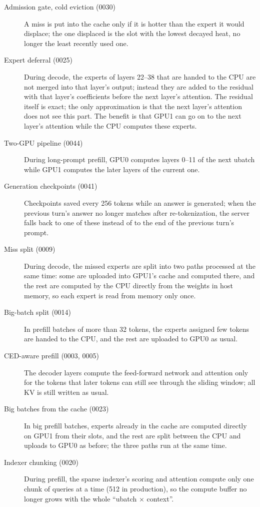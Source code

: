\documentclass[11pt,a4paper]{article}
\begin{document}
\begin{description}
  \item[Admission gate, cold eviction (0030)] A miss is put into the cache only if it is hotter than the expert it would displace; the one displaced is the slot with the lowest decayed heat, no longer the least recently used one.
  \item[Expert deferral (0025)] During decode, the experts of layers 22--38 that are handed to the CPU are not merged into that layer's output; instead they are added to the residual with that layer's coefficients before the next layer's attention. The residual itself is exact; the only approximation is that the next layer's attention does not see this part. The benefit is that GPU1 can go on to the next layer's attention while the CPU computes these experts.
  \item[Two-GPU pipeline (0044)] During long-prompt prefill, GPU0 computes layers 0--11 of the next ubatch while GPU1 computes the later layers of the current one.
  \item[Generation checkpoints (0041)] Checkpoints saved every 256 tokens while an answer is generated; when the previous turn's answer no longer matches after re-tokenization, the server falls back to one of these instead of to the end of the previous turn's prompt.
  \item[Miss split (0009)] During decode, the missed experts are split into two paths processed at the same time: some are uploaded into GPU1's cache and computed there, and the rest are computed by the CPU directly from the weights in host memory, so each expert is read from memory only once.
  \item[Big-batch split (0014)] In prefill batches of more than 32 tokens, the experts assigned few tokens are handed to the CPU, and the rest are uploaded to GPU0 as usual.
  \item[CED-aware prefill (0003, 0005)] The decoder layers compute the feed-forward network and attention only for the tokens that later tokens can still see through the sliding window; all KV is still written as usual.
  \item[Big batches from the cache (0023)] In big prefill batches, experts already in the cache are computed directly on GPU1 from their slots, and the rest are split between the CPU and uploads to GPU0 as before; the three paths run at the same time.
  \item[Indexer chunking (0020)] During prefill, the sparse indexer's scoring and attention compute only one chunk of queries at a time (512 in production), so the compute buffer no longer grows with the whole ``ubatch × context''.

\end{description}
\end{document}
